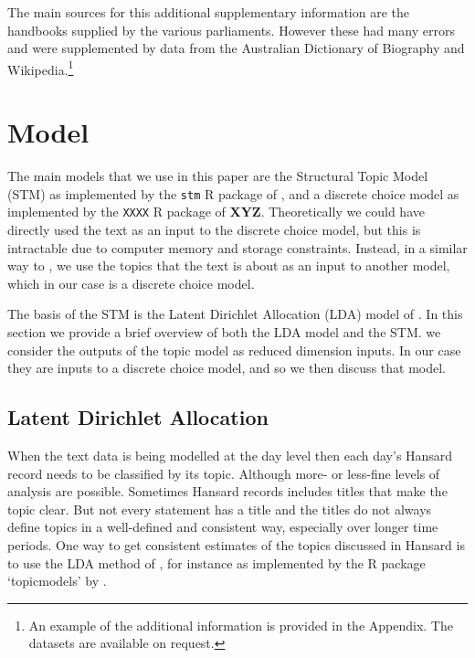 \documentclass[12pt,]{article}
\theoremstyle{definition}
\theoremstyle{definition}
\theoremstyle{definition}
\theoremstyle{remark}
\begin{document}
The main sources for this additional supplementary information are the
handbooks supplied by the various parliaments. However these had many
errors and were supplemented by data from the Australian Dictionary of
Biography and Wikipedia.\footnote{An example of the additional
  information is provided in the Appendix. The datasets are available on
  request.}

\section{Model}\label{model}

The main models that we use in this paper are the Structural Topic Model
(STM) as implemented by the \texttt{stm} R package of
\citet{RobertsStewartAiroldiRPackage}, and a discrete choice model as
implemented by the \texttt{XXXX} R package of \textbf{XYZ}.
Theoretically we could have directly used the text as an input to the
discrete choice model, but this is intractable due to computer memory
and storage constraints. Instead, in a similar way to
\citet{MuellerRauh2018}, we use the topics that the text is about as an
input to another model, which in our case is a discrete choice model.

The basis of the STM is the Latent Dirichlet Allocation (LDA) model of
\citet{Blei2003latent}. In this section we provide a brief overview of
both the LDA model and the STM. we consider the outputs of the topic
model as reduced dimension inputs. In our case they are inputs to a
discrete choice model, and so we then discuss that model.

\subsection{Latent Dirichlet
Allocation}\label{latent-dirichlet-allocation}

When the text data is being modelled at the day level then each day's
Hansard record needs to be classified by its topic. Although more- or
less-fine levels of analysis are possible. Sometimes Hansard records
includes titles that make the topic clear. But not every statement has a
title and the titles do not always define topics in a well-defined and
consistent way, especially over longer time periods. One way to get
consistent estimates of the topics discussed in Hansard is to use the
LDA method of \citet{Blei2003latent}, for instance as implemented by the
R package `topicmodels' by \citet{Grun2011}.
\end{document}
